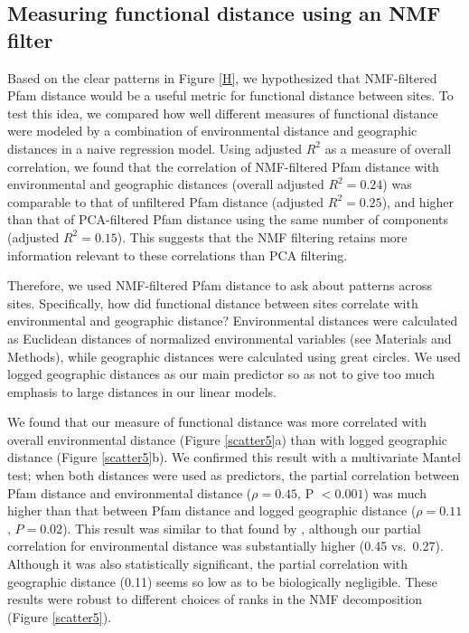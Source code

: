 
\subsection{Measuring functional distance using an NMF filter}

Based on the clear patterns in Figure \ref{H}, we hypothesized that NMF-filtered Pfam distance would be a useful metric for functional distance between sites. To test this idea, we compared how well different measures of functional distance were modeled by a combination of environmental distance and geographic distances in a naive regression model.  Using adjusted $R^2$ as a measure of overall correlation, we found that the correlation of NMF-filtered Pfam distance with environmental and geographic distances (overall adjusted $R^2 = 0.24$) was comparable to that of unfiltered Pfam distance (adjusted $R^2 = 0.25$), and higher than that of PCA-filtered Pfam distance using the same number of components (adjusted $R^2 = 0.15$). This suggests that the NMF filtering retains more information relevant to these correlations than PCA filtering.

Therefore, we used NMF-filtered Pfam distance to ask about patterns across sites. Specifically, how did functional distance between sites correlate with environmental and geographic distance?  Environmental distances were calculated as Euclidean distances of normalized environmental variables (see Materials and Methods), while geographic distances were calculated using great circles. We used logged geographic distances as our main predictor so as not to give too much emphasis to large distances in our linear models.

We found that our measure of functional distance was more correlated with overall environmental distance (Figure \ref{scatter5}a) than with logged geographic distance (Figure \ref{scatter5}b). We confirmed this result with a multivariate Mantel test; when both distances were used as predictors, the partial correlation between Pfam distance and environmental distance ($\rho=0.45$, P $< 0.001$) was much higher than that between Pfam distance and logged geographic distance ($\rho=0.11$, $P=0.02$). This result was similar to that found by \cite{RaesLetu11}, although our partial correlation for environmental distance was substantially higher (0.45 vs.\ 0.27).  Although it was also statistically significant, the partial correlation with geographic distance (0.11) seems so low as to be biologically negligible. These results were robust to different choices of ranks in the NMF decomposition (Figure \ref{scatter5}).

